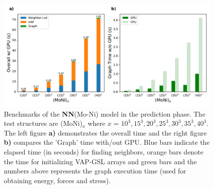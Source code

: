 \documentclass[preprint]{revtex4-2}
\begin{document}
% 
%
\begin{figure}[h!]
    \centering
    \includegraphics[scale=0.64]{figures/Prediction-speed.pdf}
\caption{\label{fig:prediction_speed} Benchmarks of the \textbf{NN}(Mo-Ni) model 
in the prediction phase. The test structures are (MoNi)$_{x}$ where 
$x$ = $10^3, 15^3, 20^3, 25^3, 30^3, 35^3, 40^3$. The left figure \textbf{a)} 
demonstrates the overall time and the right figure \textbf{b)} compares the 
'Graph' time with/out GPU. Blue bars indicate the elapsed time (in seconds) for 
finding neighbors, orange bars denote the time for initializing VAP-GSL arrays 
and green bars and the numbers above represents the graph execution time (used 
for obtaining energy, forces and stress).
}
\end{figure}
\end{document}

